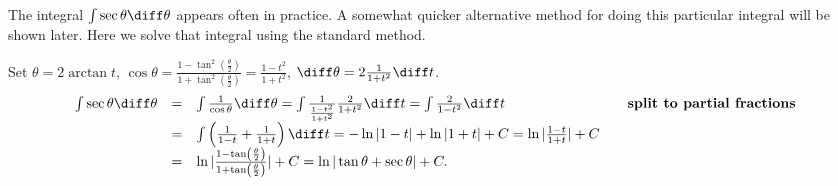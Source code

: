 \begin{frame}
The integral $\int \sec \theta \diff \theta$ appears often in practice. A somewhat quicker alternative method for doing this particular integral will be shown later. Here we solve that integral using the standard method.
\begin{example}
Set $\theta=2\arctan t$, $\cos \theta = \frac{1-\tan^2(\frac{\theta}{2}) }{1+\tan^2\left(\frac{\theta}{2}\right)}=\frac{1-t^2}{1+t^2}$, $\diff \theta = 2\frac{1}{1+t^2}\diff t$.
\[
\begin{array}{rclll}
\int \sec \theta\diff\theta &=& \int \frac{1}{\cos \theta}\diff \theta = \int \frac{1}{\frac{1-t^2}{1+t^2}} \frac{2}{1+t^2} \diff t= \int \frac{2}{1-t^2}\diff t &&\textbf{split to partial fractions }\\
&=&\int \left(\frac{1}{1-t}+\frac{1}{1+t}\right)\diff t=- \ln |1-t|+\ln |1+t| +C=\ln |\frac{1-t}{1+t}|+C\\
&=& \ln |\frac{1-\tan \left(\frac{\theta}{2}\right)}{1+\tan \left(\frac{\theta}{2}\right)}|+C = \ln |\tan \theta +\sec \theta| +C.
\end{array}
\]
\end{example}

\end{frame}